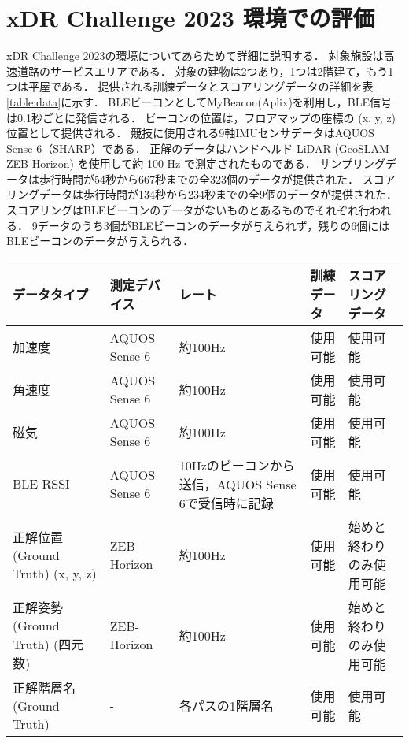 
\section{xDR Challenge 2023 環境での評価}


xDR Challenge 2023の環境についてあらためて詳細に説明する．
対象施設は高速道路のサービスエリアである．
対象の建物は2つあり，1つは2階建て，もう1つは平屋である．
提供される訓練データとスコアリングデータの詳細を表\ref{table:data}に示す．
BLEビーコンとしてMyBeacon(Aplix)\cite{beacon-aplix}を利用し，BLE信号は0.1秒ごとに発信される．
ビーコンの位置は，フロアマップの座標の (x, y, z) 位置として提供される．
競技に使用される9軸IMUセンサデータはAQUOS Sense 6（SHARP）である．
正解のデータはハンドヘルド LiDAR (GeoSLAM ZEB-Horizon) を使用して約 100 Hz で測定されたものである．
サンプリングデータは歩行時間が54秒から667秒までの全323個のデータが提供された．
スコアリングデータは歩行時間が134秒から234秒までの全9個のデータが提供された．
スコアリングはBLEビーコンのデータがないものとあるものでそれぞれ行われる．
9データのうち3個がBLEビーコンのデータが与えられず，残りの6個にはBLEビーコンのデータが与えられる．

\begin{table*}[ht]
    \centering
    \caption{提供データの概要}
    \begin{tabularx}{\textwidth}{|X|l|X|l|l|}
        \hline
        データタイプ & 測定デバイス & レート & 訓練データ & スコアリングデータ \\ \hline
        加速度 & AQUOS Sense 6 & 約100Hz & 使用可能 & 使用可能 \\ \hline
        角速度 & AQUOS Sense 6 & 約100Hz & 使用可能 & 使用可能 \\ \hline
        磁気 & AQUOS Sense 6 & 約100Hz & 使用可能 & 使用可能 \\ \hline
        BLE RSSI & AQUOS Sense 6 & 10Hzのビーコンから送信，AQUOS Sense 6で受信時に記録 & 使用可能 & 使用可能 \\ \hline
        正解位置 (Ground Truth) (x, y, z) & ZEB-Horizon & 約100Hz & 使用可能 & 始めと終わりのみ使用可能 \\ \hline
        正解姿勢 (Ground Truth) (四元数) & ZEB-Horizon & 約100Hz & 使用可能 & 始めと終わりのみ使用可能 \\ \hline
        正解階層名 (Ground Truth) & - & 各パスの1階層名 & 使用可能 & 使用可能 \\ \hline
    \end{tabularx}
    \label{table:data}
\end{table*}

